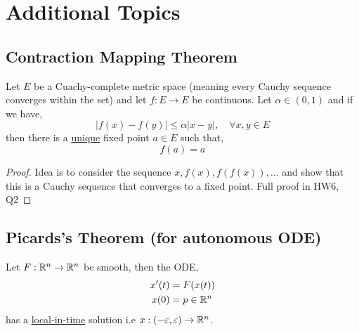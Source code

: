 \chapter{Additional Topics}

\section{Contraction Mapping Theorem}
\begin{theorem}
  Let $E$ be a Cuachy-complete metric space (meaning every Cauchy sequence converges within the set) and let $f:E \to E$ be continuous. Let $\alpha \in (0, 1)$ and if we have, 
  \[
    |f(x) -f(y)| \le \alpha |x - y|,\quad  \forall x, y \in E
  \]
  then there is a \underline{unique} fixed point $a \in E$ such that, 
  \[
    f(a) = a
  \]
\end{theorem}
\begin{proof}
  Idea is to consider the sequence $x, f(x), f(f(x)), \dots$ and show that this is a Cauchy sequence that converges to a fixed point. Full proof in HW6, Q2
\end{proof}


\section{Picards's  Theorem  (for autonomous ODE)}
\begin{theorem}
  Let $F: \mathbb{R}^{n} \to \mathbb{R}^{n}$ be smooth, then the ODE, 
  \begin{align*}
    x'(t) &= F(x(t))\\
    x(0) & = p \in \mathbb{R}^{n}
  \end{align*}
  has a \underline{local-in-time} solution i.e $x: (-\varepsilon, \varepsilon) \to \mathbb{R}^{n}$.
\end{theorem}

